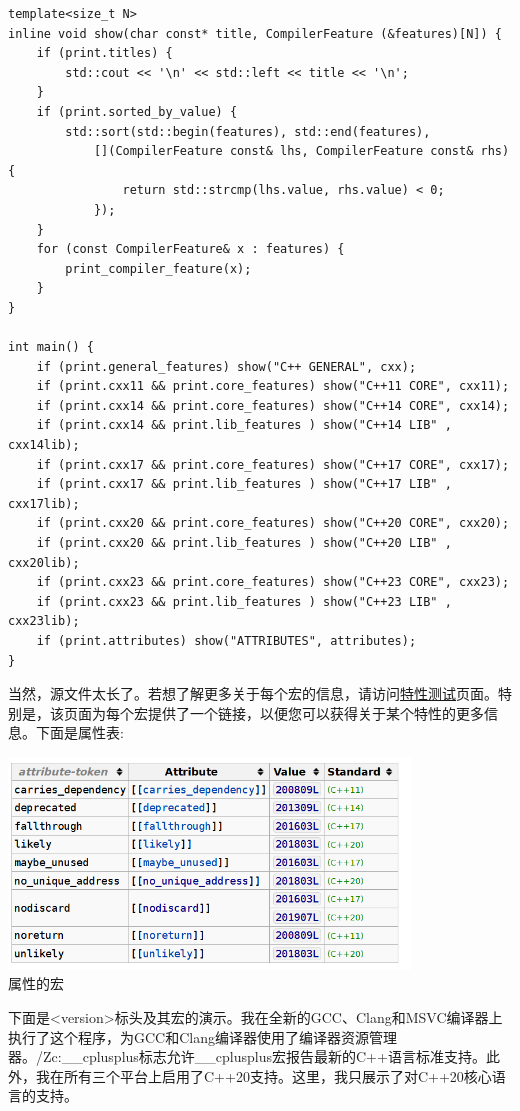 \begin{lstlisting}[style=styleCXX]
template<size_t N>
inline void show(char const* title, CompilerFeature (&features)[N]) {
	if (print.titles) {
		std::cout << '\n' << std::left << title << '\n';
	}
	if (print.sorted_by_value) {
		std::sort(std::begin(features), std::end(features),
			[](CompilerFeature const& lhs, CompilerFeature const& rhs) {
				return std::strcmp(lhs.value, rhs.value) < 0;
			});
	}
	for (const CompilerFeature& x : features) {
		print_compiler_feature(x);
	}
}

int main() {
	if (print.general_features) show("C++ GENERAL", cxx);
	if (print.cxx11 && print.core_features) show("C++11 CORE", cxx11);
	if (print.cxx14 && print.core_features) show("C++14 CORE", cxx14);
	if (print.cxx14 && print.lib_features ) show("C++14 LIB" , cxx14lib);
	if (print.cxx17 && print.core_features) show("C++17 CORE", cxx17);
	if (print.cxx17 && print.lib_features ) show("C++17 LIB" , cxx17lib);
	if (print.cxx20 && print.core_features) show("C++20 CORE", cxx20);
	if (print.cxx20 && print.lib_features ) show("C++20 LIB" , cxx20lib);
	if (print.cxx23 && print.core_features) show("C++23 CORE", cxx23);
	if (print.cxx23 && print.lib_features ) show("C++23 LIB" , cxx23lib);
	if (print.attributes) show("ATTRIBUTES", attributes);
}
\end{lstlisting}

当然，源文件太长了。若想了解更多关于每个宏的信息，请访问\href{https://en.cppreference.com/w/cpp/feature_test}{特性测试}页面。特别是，该页面为每个宏提供了一个链接，以便您可以获得关于某个特性的更多信息。下面是属性表:

\begin{center}
\includegraphics[width=0.8\textwidth]{content/5/chapter9/images/2.png}\\
属性的宏
\end{center}

下面是<version>标头及其宏的演示。我在全新的GCC、Clang和MSVC编译器上执行了这个程序，为GCC和Clang编译器使用了编译器资源管理器。/Zc:\_\_cplusplus标志允许\_\_cplusplus宏报告最新的C++语言标准支持。此外，我在所有三个平台上启用了C++20支持。这里，我只展示了对C++20核心语言的支持。

